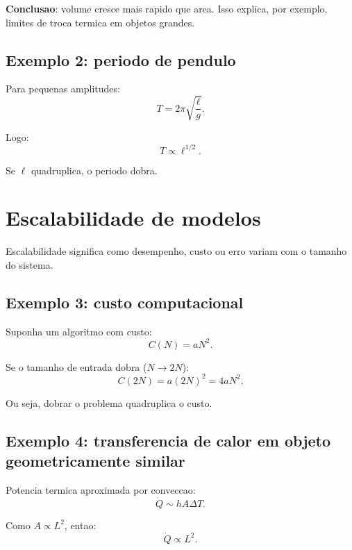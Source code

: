 \documentclass[12pt,a4paper,oneside]{book}
\theoremstyle{definition}
\begin{document}
\textbf{Conclusao}: volume cresce mais rapido que area. Isso explica, por exemplo, limites de troca termica em objetos grandes.

\subsection{Exemplo 2: periodo de pendulo}

Para pequenas amplitudes:
\begin{equation}
T = 2\pi\sqrt{\frac{\ell}{g}}.
\end{equation}

Logo:
\begin{equation}
T \propto \ell^{1/2}.
\end{equation}

Se $\ell$ quadruplica, o periodo dobra.

\section{Escalabilidade de modelos}

Escalabilidade significa como desempenho, custo ou erro variam com o tamanho do sistema.

\subsection{Exemplo 3: custo computacional}

Suponha um algoritmo com custo:
\begin{equation}
C(N) = aN^2.
\end{equation}

Se o tamanho de entrada dobra ($N \to 2N$):
\begin{equation}
C(2N) = a(2N)^2 = 4aN^2.
\end{equation}

Ou seja, dobrar o problema quadruplica o custo.

\subsection{Exemplo 4: transferencia de calor em objeto geometricamente similar}

Potencia termica aproximada por conveccao:
\begin{equation}
\dot{Q} \sim hA\Delta T.
\end{equation}

Como $A \propto L^2$, entao:
\begin{equation}
\dot{Q} \propto L^2.
\end{equation}
\end{document}
